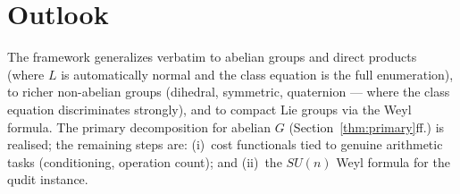 \documentclass[11pt,a4paper]{article}
\theoremstyle{plain}
\theoremstyle{definition}
\theoremstyle{remark}
\begin{document}
\section{Outlook}

The framework generalizes verbatim to abelian groups and direct products (where
$L$ is automatically normal and the class equation is the full enumeration),
to richer non-abelian groups (dihedral, symmetric, quaternion --- where the
class equation discriminates strongly), and to compact Lie groups via the Weyl
formula. The primary decomposition for abelian $G$
(Section~\ref{thm:primary}ff.) is realised; the remaining steps are:
(i)~cost functionals tied to genuine arithmetic tasks (conditioning, operation
count); and (ii)~the $SU(n)$ Weyl formula for the qudit instance.
\end{document}
